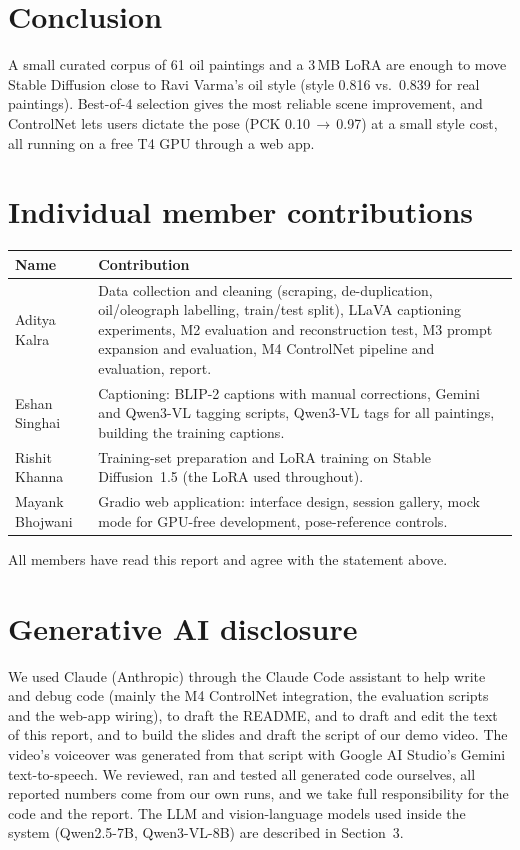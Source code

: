 \documentclass[11pt,a4paper,twocolumn]{article}
\begin{document}
\section{Conclusion}
A small curated corpus of 61 oil paintings and a 3\,MB LoRA are enough to move Stable Diffusion close to
Ravi Varma's oil style (style 0.816 vs.\ 0.839 for real paintings). Best-of-4 selection gives the most
reliable scene improvement, and ControlNet lets users dictate the pose (PCK 0.10\,$\rightarrow$\,0.97) at
a small style cost, all running on a free T4 GPU through a web app.

\section*{Individual member contributions}
{\small
\begin{tabularx}{\linewidth}{@{}l >{\raggedright\arraybackslash}X@{}}
\toprule
Name & Contribution \\
\midrule
Aditya Kalra & Data collection and cleaning (scraping, de-duplication, oil/oleograph labelling, train/test split),
LLaVA captioning experiments, M2 evaluation and reconstruction test, M3 prompt expansion and evaluation, M4
ControlNet pipeline and evaluation, report. \\
Eshan Singhai & Captioning: BLIP-2 captions with manual corrections, Gemini and Qwen3-VL tagging scripts,
Qwen3-VL tags for all paintings, building the training captions. \\
Rishit Khanna & Training-set preparation and LoRA training on Stable Diffusion~1.5 (the LoRA used throughout). \\
Mayank Bhojwani & Gradio web application: interface design, session gallery, mock mode for GPU-free
development, pose-reference controls. \\
\bottomrule
\end{tabularx}}

\smallskip
\noindent All members have read this report and agree with the statement above.

\section*{Generative AI disclosure}
We used Claude (Anthropic) through the Claude Code assistant to help write and debug code (mainly the M4
ControlNet integration, the evaluation scripts and the web-app wiring), to draft the README, and to draft and
edit the text of this report, and to build the slides and draft the script of our demo video. The video's
voiceover was generated from that script with Google AI Studio's Gemini text-to-speech. We reviewed, ran and tested all generated code ourselves, all reported numbers
come from our own runs, and we take full responsibility for the code and the report. The LLM and
vision-language models used inside the system (Qwen2.5-7B, Qwen3-VL-8B) are described in Section~3.
\end{document}
